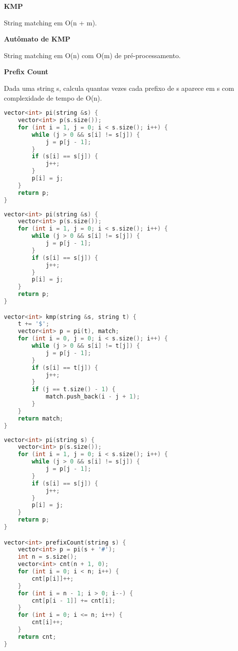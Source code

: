 \documentclass[11pt, a4paper, oneside]{book}
\begin{document}
\textbf{KMP} 



String matching em O(n + m).



\textbf{Autômato de KMP} 



String matching em O(n) com O(m) de pré-processamento.



\textbf{Prefix Count} 



Dada uma string s, calcula quantas vezes cada prefixo de s aparece em s com complexidade de tempo de O(n).

\hfill

\begin{multicols}{2}
\begin{lstlisting}[language=C++]
vector<int> pi(string &s) {
    vector<int> p(s.size());
    for (int i = 1, j = 0; i < s.size(); i++) {
        while (j > 0 && s[i] != s[j]) {
            j = p[j - 1];
        }
        if (s[i] == s[j]) {
            j++;
        }
        p[i] = j;
    }
    return p;
}
\end{lstlisting}
\end{multicols}

\hfill

\begin{multicols}{2}
\begin{lstlisting}[language=C++]
vector<int> pi(string &s) {
    vector<int> p(s.size());
    for (int i = 1, j = 0; i < s.size(); i++) {
        while (j > 0 && s[i] != s[j]) {
            j = p[j - 1];
        }
        if (s[i] == s[j]) {
            j++;
        }
        p[i] = j;
    }
    return p;
}

vector<int> kmp(string &s, string t) {
    t += '$';
    vector<int> p = pi(t), match;
    for (int i = 0, j = 0; i < s.size(); i++) {
        while (j > 0 && s[i] != t[j]) {
            j = p[j - 1];
        }
        if (s[i] == t[j]) {
            j++;
        }
        if (j == t.size() - 1) {
            match.push_back(i - j + 1);
        }
    }
    return match;
}
\end{lstlisting}
\end{multicols}

\hfill

\begin{multicols}{2}
\begin{lstlisting}[language=C++]
vector<int> pi(string s) {
    vector<int> p(s.size());
    for (int i = 1, j = 0; i < s.size(); i++) {
        while (j > 0 && s[i] != s[j]) {
            j = p[j - 1];
        }
        if (s[i] == s[j]) {
            j++;
        }
        p[i] = j;
    }
    return p;
}

vector<int> prefixCount(string s) {
    vector<int> p = pi(s + '#');
    int n = s.size();
    vector<int> cnt(n + 1, 0);
    for (int i = 0; i < n; i++) {
        cnt[p[i]]++;
    }
    for (int i = n - 1; i > 0; i--) {
        cnt[p[i - 1]] += cnt[i];
    }
    for (int i = 0; i <= n; i++) {
        cnt[i]++;
    }
    return cnt;
}\end{lstlisting}
\end{multicols}
\end{document}
